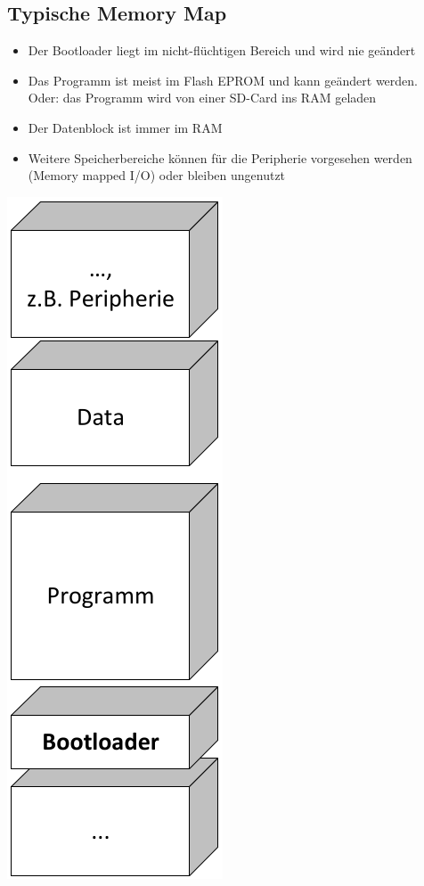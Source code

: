 \subsection{Typische Memory Map}
\begin{multicols}{2}
\begin{itemize}
  \item Der Bootloader liegt im nicht-flüchtigen Bereich und wird nie geändert
  \item Das Programm ist meist im Flash EPROM und kann geändert werden.\\ Oder: das Programm wird von einer SD-Card ins RAM geladen
  \item Der Datenblock ist immer im RAM
  \item Weitere Speicherbereiche können für die Peripherie vorgesehen werden (Memory mapped I/O) oder bleiben ungenutzt
\end{itemize}
\vfill\null
\columnbreak
\begin{center}
\includegraphics[width=0.3\linewidth]{images/Bootstrap/memoryMap}
\end{center}
\end{multicols}


